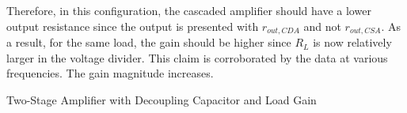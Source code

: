 Therefore, in this configuration, the cascaded amplifier should have a lower output resistance since the output is presented with $r_{out,CDA}$ and not $r_{out,CSA}$.
As a result, for the same load, the gain should be higher since $R_{L}$ is now relatively larger in the voltage divider.
This claim is corroborated by the data at various frequencies.
The gain magnitude increases.

\FloatBarrier

\begin{table}[h!]
	\centering
	\caption{Two-Stage Amplifier with Decoupling Capacitor and Load Gain}
	\label{tab:gain_part3_cascade}
\end{table}

\FloatBarrier
